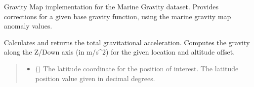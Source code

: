 \documentclass[letterpaper,10pt,english]{sphinxmanual}
\begin{document}
\begin{fulllineitems}
\label{\detokenize{modules/gravity/marine:qnav.gravity.marine.MarineGravity}}
\pysigstartsignatures
{}
\pysigstopsignatures
\sphinxAtStartPar
Gravity Map implementation for the Marine Gravity dataset.
Provides corrections for a given base gravity function, using the
marine gravity map anomaly values.

\begin{fulllineitems}
\label{\detokenize{modules/gravity/marine:qnav.gravity.marine.MarineGravity.calc_gravity_z}}
\pysigstartsignatures
{}
\pysigstopsignatures
\sphinxAtStartPar
Calculates and returns the total gravitational acceleration.
Computes the gravity along the Z/Down axis (in m/s\textasciicircum{}2) for
the given location and altitude offset.
\begin{quote}\begin{description}
\begin{itemize}
\item {} 
\sphinxAtStartPar
{} () \textendash{} The latitude coordinate for the position of interest.
The latitude position value given in decimal degrees.


\end{itemize}
\end{description}
\end{quote}
\end{fulllineitems}
\end{fulllineitems}
\end{document}

